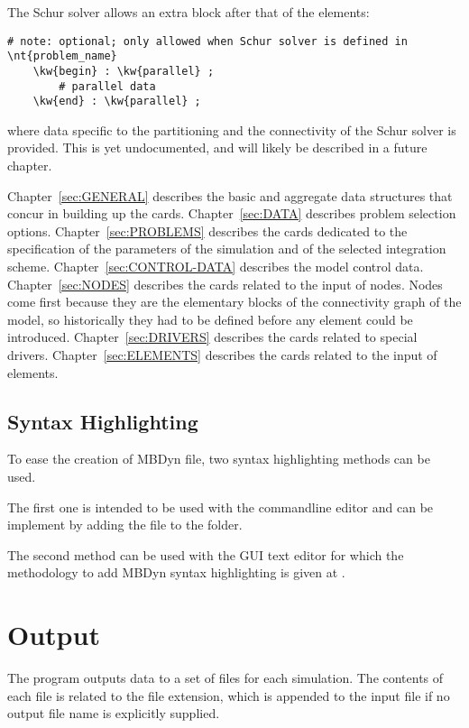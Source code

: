 The Schur solver allows an extra block after that of the elements:
\begin{Verbatim}[commandchars=\\\{\}]
    # note: optional; only allowed when Schur solver is defined in \nt{problem_name}
    \kw{begin} : \kw{parallel} ;
        # parallel data
    \kw{end} : \kw{parallel} ;
\end{Verbatim}
where data specific to the partitioning and the connectivity
of the Schur solver is provided.
This is yet undocumented, and will likely be described 
in a future chapter.

Chapter~\ref{sec:GENERAL} describes the basic and aggregate
data structures that concur in building up the cards.
Chapter~\ref{sec:DATA} describes problem selection options.
Chapter~\ref{sec:PROBLEMS} describes the cards dedicated
to the specification of the parameters of the simulation
and of the selected integration scheme.
Chapter~\ref{sec:CONTROL-DATA} describes the model control data.
Chapter~\ref{sec:NODES} describes the cards related to the input
of nodes.
Nodes come first because they are the elementary blocks 
of the connectivity graph of the model, so historically 
they had to be defined before any element could be introduced.
Chapter~\ref{sec:DRIVERS} describes the cards related 
to special drivers.
Chapter~\ref{sec:ELEMENTS} describes the cards related to the input
of elements.

\subsection{Syntax Highlighting}
To ease the creation of MBDyn file, two syntax highlighting methods can be used.

The first one is intended to be used with the 
commandline editor and can be implement by
adding the  file to the  folder.

The second method can be used with the 
GUI text editor for which the methodology to
add MBDyn syntax highlighting is given at
.





\section{Output}
The program outputs data to a set of files for each simulation.
The contents of each file is related to the file extension,
which is appended to the input file if no output file name 
is explicitly supplied.

